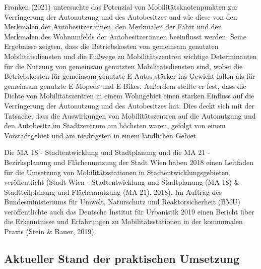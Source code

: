 \documentclass[
]{book}
\begin{document}
Franken (2021) untersuchte das Potenzial von Mobilitätsknotenpunkten zur Verringerung der Autonutzung und des Autobesitzes und wie diese von den Merkmalen der Autobesitzer:innen, den Merkmalen der Fahrt und den Merkmalen des Wohnumfelds der Autobesitzer:innen beeinflusst werden. Seine Ergebnisse zeigten, dass die Betriebskosten von gemeinsam genutzten Mobilitätsdiensten und die Fußwege zu Mobilitätszentren wichtige Determinanten für die Nutzung von gemeinsam genutzten Mobilitätsdiensten sind, wobei die Betriebskosten für gemeinsam genutzte E-Autos stärker ins Gewicht fallen als für gemeinsam genutzte E-Mopeds und E-Bikes. Außerdem stellte er fest, dass die Dichte von Mobilitätszentren in einem Wohngebiet einen starken Einfluss auf die Verringerung der Autonutzung und des Autobesitzes hat. Dies deckt sich mit der Tatsache, dass die Auswirkungen von Mobilitätszentren auf die Autonutzung und den Autobesitz im Stadtzentrum am höchsten waren, gefolgt von einem Vorstadtgebiet und am niedrigsten in einem ländlichen Gebiet.

Die MA 18 - Stadtentwicklung und Stadtplanung und die MA 21 - Bezirksplanung und Flächennutzung der Stadt Wien haben 2018 einen Leitfaden für die Umsetzung von Mobilitätsstationen in Stadtentwicklungsgebieten veröffentlicht (Stadt Wien - Stadtentwicklung und Stadtplanung (MA 18) \& Stadtteilplanung und Flächennutzung (MA 21), 2018). Im Auftrag des Bundesministeriums für Umwelt, Naturschutz und Reaktorsicherheit (BMU) veröffentlichte auch das Deutsche Institut für Urbanistik 2019 einen Bericht über die Erkenntnisse und Erfahrungen zu Mobilitätsstationen in der kommunalen Praxis (Stein \& Bauer, 2019).

\hypertarget{aktueller-stand-der-praktischen-umsetzung-28}{%
\subsection*{Aktueller Stand der praktischen Umsetzung}\label{aktueller-stand-der-praktischen-umsetzung-28}}
\end{document}
